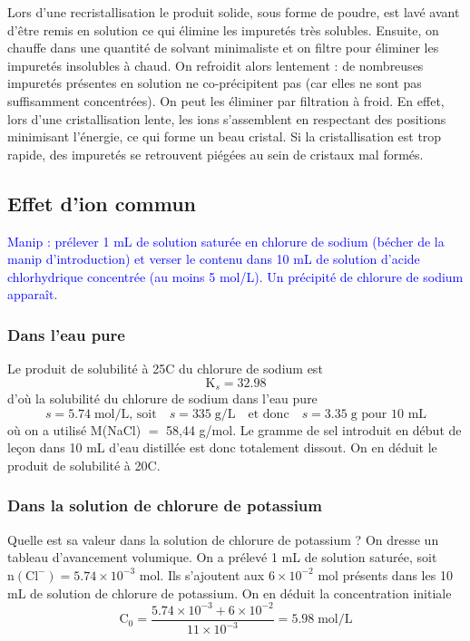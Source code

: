 \documentclass[11pt,a4paper]{report}
\begin{document}
Lors d'une recristallisation le produit solide, sous forme de poudre, est lavé avant d'être remis en solution ce qui élimine les impuretés très solubles. Ensuite, on chauffe dans une quantité de solvant minimaliste et on filtre pour éliminer les impuretés insolubles à chaud. On refroidit alors lentement : de nombreuses impuretés présentes en solution ne co-précipitent pas (car elles ne sont pas suffisamment concentrées). On peut les éliminer par filtration à froid. En effet, lors d'une cristallisation lente, les ions s'assemblent en respectant des positions minimisant l'énergie, ce qui forme un beau cristal. Si la cristallisation est trop rapide, des impuretés se retrouvent piégées au sein de cristaux mal formés.

\newpage
\subsection{Effet d'ion commun}
\textcolor{blue}{Manip : prélever 1 mL de solution saturée en chlorure de sodium (bécher de la manip d'introduction) et verser le contenu dans 10 mL de solution d'acide chlorhydrique concentrée (au moins 5 mol/L). Un précipité de chlorure de sodium apparaît}.

\subsubsection{Dans l'eau pure}

Le produit de solubilité à 25\degree C du chlorure de sodium est
\begin{equation}
	\text{K}_s = 32.98
\end{equation}
d'où la solubilité du chlorure de sodium dans l'eau pure 
\begin{equation}
	s = 5.74\;\text{mol/L, soit}\quad s = 335\;\text{g/L} \quad\text{et donc}\quad
	s = 3.35\;\text{g pour 10 mL}
\end{equation}
où on a utilisé M(NaCl) $=$ 58,44 g/mol. Le gramme de sel introduit en début de leçon dans 10 mL d'eau distillée est donc totalement dissout. On en déduit le produit de solubilité à 20\degree C.

\subsubsection{Dans la solution de chlorure de potassium}

Quelle est sa valeur dans la solution de chlorure de potassium ? On dresse un tableau d'avancement volumique. On a prélevé 1 mL de solution saturée, soit $\text{n}(\text{Cl}^-) = 5.74\times 10^{-3}$ mol. Ils s'ajoutent aux $6\times 10^{-2}$ mol présents dans les 10 mL de solution de chlorure de potassium. On en déduit la concentration initiale 
\begin{equation}
	\text{C}_0 = \frac{5.74\times 10^{-3} + 6\times 10^{-2}}{11\times 10^{-3}} = 5.98\;\text{mol/L}
\end{equation}
\end{document}
